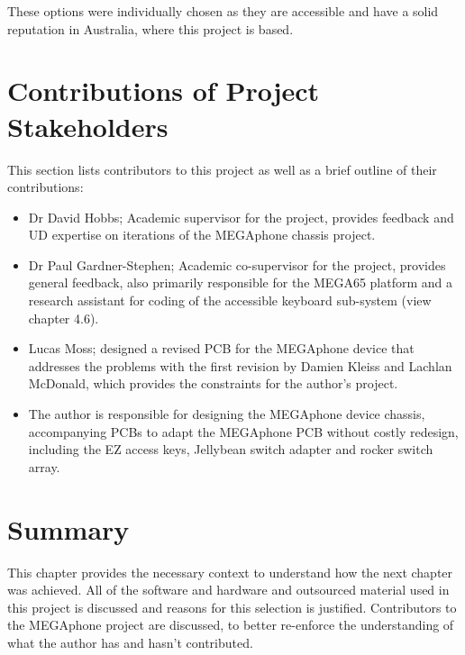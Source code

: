These options were individually chosen as they are accessible and have a solid reputation in Australia, where this project is based.

\section{Contributions of Project Stakeholders} 

This section lists contributors to this project as well as a brief outline of their contributions:

\begin{itemize} 
    \item Dr David Hobbs; Academic supervisor for the project, provides feedback and UD expertise on iterations of the MEGAphone chassis project.
    \item Dr Paul Gardner-Stephen; Academic co-supervisor for the project, provides general feedback, also primarily responsible for the MEGA65 platform and a research assistant for coding of the accessible keyboard sub-system (view chapter 4.6).
    \item Lucas Moss; designed a revised PCB for the MEGAphone device that addresses the problems with the first revision by Damien Kleiss and Lachlan McDonald, which provides the constraints for the author's project.
    \item The author is responsible for designing the MEGAphone device chassis, accompanying PCBs to adapt the MEGAphone PCB without costly redesign, including the EZ access keys, Jellybean switch adapter and rocker switch array.
\end{itemize}


\section{Summary}

This chapter provides the necessary context to understand how the next chapter was achieved.
All of the software and hardware and outsourced material used in this project is discussed and reasons for this selection is justified.
Contributors to the MEGAphone project are discussed, to better re-enforce the understanding of what the author has and hasn't contributed.